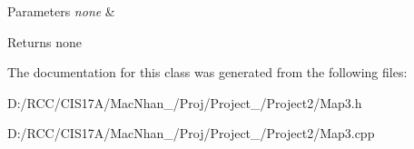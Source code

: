 \begin{DoxyParams}{Parameters}
{\em none} & \\
\hline
\end{DoxyParams}
\begin{DoxyReturn}{Returns}
none 
\end{DoxyReturn}


The documentation for this class was generated from the following files\+:\begin{DoxyCompactItemize}
\item 
D\+:/\+R\+C\+C/\+C\+I\+S17\+A/\+Mac\+Nhan\+\_/\+Proj/\+Project\+\_/\+Project2/Map3.\+h\item 
D\+:/\+R\+C\+C/\+C\+I\+S17\+A/\+Mac\+Nhan\+\_/\+Proj/\+Project\+\_/\+Project2/Map3.\+cpp\end{DoxyCompactItemize}
